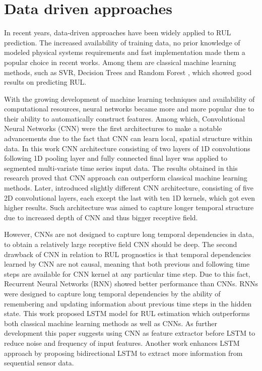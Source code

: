 \section{Data driven approaches}
In recent years, data-driven approaches have been widely applied to RUL prediction. The increased availability of training data, no prior knowledge of modeled physical systems requirements and fast implementation made them a popular choice in recent works.  Among them are classical machine learning methods, such as SVR, Decision Trees and Random Forest \cite{Wang2015, Sangram201887623}, which showed good results on predicting RUL.   

With the growing development of machine learning techniques and availability of computational resources, neural networks became more and more popular due to their ability to automatically construct features. Among which, Convolutional Neural Networks (CNN) were the first architectures to make a notable advancements due to the fact that CNN can learn local, spatial structure within data.  In this work \cite{Babu2016} CNN architecture consisting of two layers of 1D convolutions following 1D pooling layer and fully connected final layer was applied to segmented multi-variate time series input data. The results obtained in this research proved that CNN approach can outperform classical machine learning methods. Later, \cite{LI20181} introduced slightly different CNN architecture, consisting of five 2D convolutional layers, each except the last with ten 1D kernels, which got even higher results. Such architecture was aimed to capture longer temporal structure due to increased depth of CNN and thus bigger receptive field.  

However, CNNs are not designed to capture long temporal dependencies in data, to obtain a relatively large receptive field CNN should be deep. The second drawback of CNN in relation to RUL prognostics is that temporal dependencies learned by CNN are not causal, meaning that both previous and following time steps are available for CNN kernel at any particular time step. Due to this fact, Recurrent Neural Networks (RNN) showed better performance than CNNs. RNNs were designed to capture long temporal dependencies by the ability of remembering and updating information about previous time steps in the hidden state. This work \cite{Zheng2017} proposed LSTM model for RUL estimation which outperforms both classical machine learning methods as well as CNNs. As further development this paper suggests using CNN as feature extractor before LSTM to reduce noise and frequency of input features. Another work \cite{ELSHEIKH2019148} enhances LSTM approach by proposing bidirectional LSTM to extract more information from sequential sensor data.  

